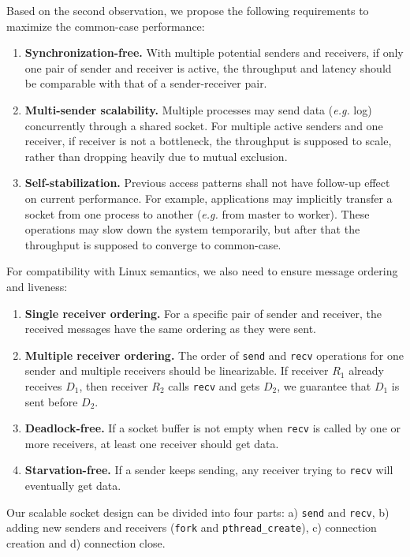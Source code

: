 Based on the second observation, we propose the following requirements to maximize the common-case performance:
\begin{enumerate}
 \item \textbf{Synchronization-free.} With multiple potential senders and receivers, if only one pair of sender and receiver is active, the throughput and latency should be comparable with that of a sender-receiver pair.
 \item \textbf{Multi-sender scalability.} Multiple processes may send data (\textit{e.g.} log) concurrently through a shared socket. For multiple active senders and one receiver, if receiver is not a bottleneck, the throughput is supposed to scale, rather than dropping heavily due to mutual exclusion.
 \item \textbf{Self-stabilization.} Previous access patterns shall not have follow-up effect on current performance. For example, applications may implicitly transfer a socket from one process to another (\textit{e.g.} from master to worker). These operations may slow down the system temporarily, but after that the throughput is supposed to converge to common-case.
\end{enumerate}

For compatibility with Linux semantics, we also need to ensure message ordering and liveness:
\begin{enumerate}
\item \textbf{Single receiver ordering.} For a specific pair of sender and receiver, the received messages have the same ordering as they were sent.
\item \textbf{Multiple receiver ordering.} The order of \texttt{send} and \texttt{recv} operations for one sender and multiple receivers should be linearizable. If receiver $R_1$ already receives $D_1$, then receiver $R_2$ calls \texttt{recv} and gets $D_2$, we guarantee that $D_1$ is sent before $D_2$.
\item \textbf{Deadlock-free.} If a socket buffer is not empty when \texttt{recv} is called by one or more receivers, at least one receiver should get data.
\item \textbf{Starvation-free.} If a sender keeps sending, any receiver trying to \texttt{recv} will eventually get data.
\end{enumerate}

Our scalable socket design can be divided into four parts: a) \texttt{send} and \texttt{recv}, b) adding new senders and receivers (\texttt{fork} and \texttt{pthread\_create}), c) connection creation and d) connection close.

